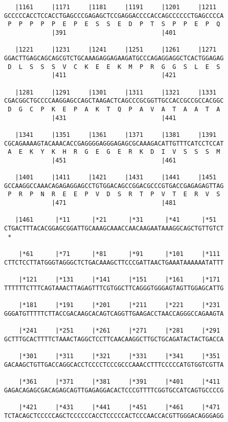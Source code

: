 \documentclass{article}
\begin{document}
\begin{Verbatim}
   |1161     |1171     |1181     |1191     |1201     |1211  
GCCCCCACCTCCACCTGAGCCCGAGAGCTCCGAGGACCCCACCAGCCCCCCTGAGCCCCA
 P  P  P  P  P  E  P  E  S  S  E  D  P  T  S  P  P  E  P  Q 
             |391                          |401             
  
   |1221     |1231     |1241     |1251     |1261     |1271  
GGACTTGAGCAGCAGCGTCTGCAAAGAGGAGAAGATGCCCAGAGGAGGCTCACTGGAGAG
 D  L  S  S  S  V  C  K  E  E  K  M  P  R  G  G  S  L  E  S 
             |411                          |421             
  
   |1281     |1291     |1301     |1311     |1321     |1331  
CGACGGCTGCCCCAAGGAGCCAGCTAAGACTCAGCCCGCGGTTGCCACCGCCGCCACGGC
 D  G  C  P  K  E  P  A  K  T  Q  P  A  V  A  T  A  A  T  A 
             |431                          |441             
  
   |1341     |1351     |1361     |1371     |1381     |1391  
CGCAGAAAAGTACAAACACCGAGGGGAGGGAGAGCGCAAAGACATTGTTTCATCCTCCAT
 A  E  K  Y  K  H  R  G  E  G  E  R  K  D  I  V  S  S  S  M 
             |451                          |461             
  
   |1401     |1411     |1421     |1431     |1441     |1451  
GCCAAGGCCAAACAGAGAGGAGCCTGTGGACAGCCGGACGCCCGTGACCGAGAGAGTTAG
 P  R  P  N  R  E  E  P  V  D  S  R  T  P  V  T  E  R  V  S 
             |471                          |481             
  
   |1461      |*11      |*21      |*31      |*41      |*51  
CTGACTTTACACGGAGCGGATTGCAAAGCAAACCAACAAGAATAAAGGCAGCTGTTGTCT
 *   
  
    |*61      |*71      |*81      |*91      |*101     |*111 
CTTCTCCTTATGGGTAGGGCTCTGACAAAGCTTCCCGATTAACTGAAATAAAAAATATTT
  
    |*121     |*131     |*141     |*151     |*161     |*171 
TTTTTTCTTTCAGTAAACTTAGAGTTTCGTGGCTTCAGGGTGGGAGTAGTTGGAGCATTG
  
    |*181     |*191     |*201     |*211     |*221     |*231 
GGGATGTTTTTCTTACCGACAAGCACAGTCAGGTTGAAGACCTAACCAGGGCCAGAAGTA
  
    |*241     |*251     |*261     |*271     |*281     |*291 
GCTTTGCACTTTTCTAAACTAGGCTCCTTCAACAAGGCTTGCTGCAGATACTACTGACCA
  
    |*301     |*311     |*321     |*331     |*341     |*351 
GACAAGCTGTTGACCAGGCACCTCCCCTCCCGCCCAAACCTTTCCCCCATGTGGTCGTTA
  
    |*361     |*371     |*381     |*391     |*401     |*411 
GAGACAGAGCGACAGAGCAGTTGAGAGGACACTCCCGTTTTCGGTGCCATCAGTGCCCCG
  
    |*421     |*431     |*441     |*451     |*461     |*471 
TCTACAGCTCCCCCAGCTCCCCCCACCTCCCCCACTCCCAACCACGTTGGGACAGGGAGG
  

\end{Verbatim}
\end{document}

